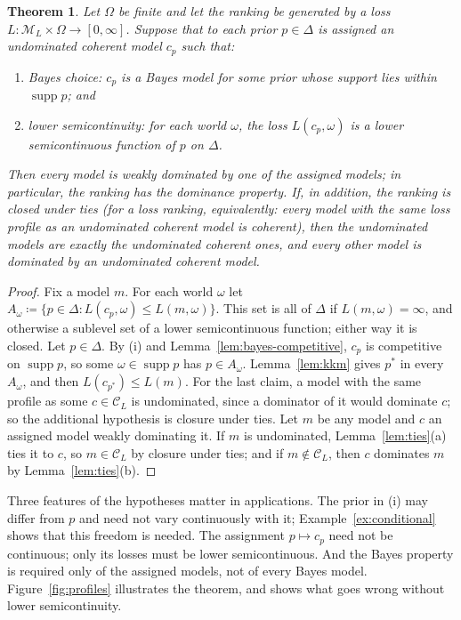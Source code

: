 \documentclass[11pt]{article}
\newtheorem{theorem}{Theorem}[section]
\theoremstyle{definition}
\theoremstyle{remark}
\newcommand{\M}{\mathcal M}
\newcommand{\C}{\mathcal C}
\newcommand{\supp}{\operatorname{supp}}
\begin{document}
\begin{theorem}\label{thm:bayes-finite}
Let $\Omega$ be finite and let the ranking be generated by a loss $L:\M_L\times\Omega\to[0,\infty]$. Suppose that to each prior $p\in\Delta$ is assigned an undominated coherent model $c_p$ such that:
\begin{enumerate}[label=(\roman*)]
\item \emph{Bayes choice}: $c_p$ is a Bayes model for some prior whose support lies within $\supp p$; and
\item \emph{lower semicontinuity}: for each world $\omega$, the loss $L(c_p,\omega)$ is a lower semicontinuous function of $p$ on $\Delta$.
\end{enumerate}
Then every model is weakly dominated by one of the assigned models; in particular, the ranking has the dominance property. If, in addition, the ranking is closed under ties (for a loss ranking, equivalently: every model with the same loss profile as an undominated coherent model is coherent), then the undominated models are exactly the undominated coherent ones, and every other model is dominated by an undominated coherent model.
\end{theorem}
\begin{proof}
Fix a model $m$. For each world $\omega$ let $A_\omega\coloneqq\{p\in\Delta:L(c_p,\omega)\le L(m,\omega)\}$. This set is all of $\Delta$ if $L(m,\omega)=\infty$, and otherwise a sublevel set of a lower semicontinuous function; either way it is closed. Let $p\in\Delta$. By (i) and Lemma~\ref{lem:bayes-competitive}, $c_p$ is competitive on $\supp p$, so some $\omega\in\supp p$ has $p\in A_\omega$. Lemma~\ref{lem:kkm} gives $p^*$ in every $A_\omega$, and then $L(c_{p^*})\le L(m)$. For the last claim, a model with the same profile as some $c\in\C_L$ is undominated, since a dominator of it would dominate $c$; so the additional hypothesis is closure under ties. Let $m$ be any model and $c$ an assigned model weakly dominating it. If $m$ is undominated, Lemma~\ref{lem:ties}(a) ties it to $c$, so $m\in\C_L$ by closure under ties; and if $m\notin\C_L$, then $c$ dominates $m$ by Lemma~\ref{lem:ties}(b).
\end{proof}

Three features of the hypotheses matter in applications. The prior in (i) may differ from $p$ and need not vary continuously with it; Example~\ref{ex:conditional} shows that this freedom is needed. The assignment $p\mapsto c_p$ need not be continuous; only its losses must be lower semicontinuous. And the Bayes property is required only of the assigned models, not of every Bayes model. Figure~\ref{fig:profiles} illustrates the theorem, and shows what goes wrong without lower semicontinuity.
\end{document}

